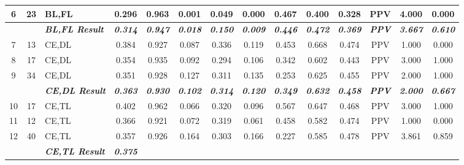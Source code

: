 \begin{table}[H]
{\begin{tabular}{cc|l|c|c|c|c|c|c|c|c|c|c|c|}
  \multicolumn{1}{|c|}{6} &
    23 &
    BL,FL &
    0.296 &
    0.963 &
    0.001 &
    0.049 &
    0.000 &
    0.467 &
    0.400 &
    0.328 &
    PPV &
    4.000 &
    0.000 \\ \hline
  \textit{\textbf{}} &
    \textit{\textbf{}} &
    \textit{\textbf{BL,FL Result}} &
    \textit{\textbf{0.314}} &
    \textit{\textbf{0.947}} &
    \textit{\textbf{0.018}} &
    \textit{\textbf{0.150}} &
    \textit{\textbf{0.009}} &
    \textit{\textbf{0.446}} &
    \textit{\textbf{0.472}} &
    \textit{\textbf{0.369}} &
    \textit{\textbf{PPV}} &
    \textit{\textbf{3.667}} &
    \textit{\textbf{0.610}} \\ \hline
  \multicolumn{1}{|c|}{7} &
    13 &
    CE,DL &
    0.384 &
    0.927 &
    0.087 &
    0.336 &
    0.119 &
    0.453 &
    0.668 &
    0.474 &
    PPV &
    1.000 &
    0.000 \\ \hline
  \multicolumn{1}{|c|}{8} &
    17 &
    CE,DL &
    0.354 &
    0.935 &
    0.092 &
    0.294 &
    0.106 &
    0.342 &
    0.602 &
    0.443 &
    PPV &
    3.000 &
    1.000 \\ \hline
  \multicolumn{1}{|c|}{9} &
    34 &
    CE,DL &
    0.351 &
    0.928 &
    0.127 &
    0.311 &
    0.135 &
    0.253 &
    0.625 &
    0.455 &
    PPV &
    2.000 &
    1.000 \\ \hline
  \textit{\textbf{}} &
    \textit{\textbf{}} &
    \textit{\textbf{CE,DL Result}} &
    \textit{\textbf{0.363}} &
    \textit{\textbf{0.930}} &
    \textit{\textbf{0.102}} &
    \textit{\textbf{0.314}} &
    \textit{\textbf{0.120}} &
    \textit{\textbf{0.349}} &
    \textit{\textbf{0.632}} &
    \textit{\textbf{0.458}} &
    \textit{\textbf{PPV}} &
    \textit{\textbf{2.000}} &
    \textit{\textbf{0.667}} \\ \hline
  \multicolumn{1}{|c|}{10} &
    17 &
    CE,TL &
    0.402 &
    0.962 &
    0.066 &
    0.320 &
    0.096 &
    0.567 &
    0.647 &
    0.468 &
    PPV &
    3.000 &
    1.000 \\ \hline
  \multicolumn{1}{|c|}{11} &
    12 &
    CE,TL &
    0.366 &
    0.921 &
    0.072 &
    0.319 &
    0.061 &
    0.458 &
    0.582 &
    0.474 &
    PPV &
    1.000 &
    0.000 \\ \hline
  \multicolumn{1}{|c|}{12} &
    40 &
    CE,TL &
    0.357 &
    0.926 &
    0.164 &
    0.303 &
    0.166 &
    0.227 &
    0.585 &
    0.478 &
    PPV &
    3.861 &
    0.859 \\ \hline
  \textit{\textbf{}} &
    \textit{\textbf{}} &
    \textit{\textbf{CE,TL Result}} &
    \textit{\textbf{0.375}} &

\end{tabular}}
\end{table}
